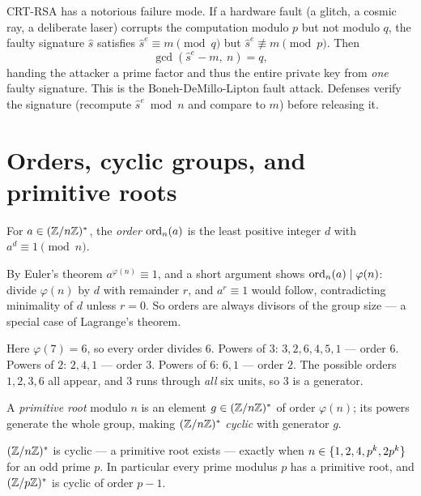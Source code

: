 \begin{attackbox}
CRT-RSA has a notorious failure mode. If a hardware fault (a glitch, a cosmic ray, a deliberate
laser) corrupts the computation modulo $p$ but not modulo $q$, the faulty signature $\hat s$
satisfies $\hat s^e \equiv m \pmod q$ but $\hat s^e \not\equiv m\pmod p$. Then
\[
  \gcd(\hat s^e - m,\ n) = q,
\]
handing the attacker a prime factor and thus the entire private key from \emph{one} faulty
signature. This is the Boneh-DeMillo-Lipton fault attack. Defenses verify the signature (recompute
$\hat s^e \bmod n$ and compare to $m$) before releasing it.
\end{attackbox}

\section{Orders, cyclic groups, and primitive roots}
\label{ch40:orders}

\begin{definition}
\label{ch40:def-order}
For $a\in(\mathbb{Z}/n\mathbb{Z})^{*}$, the \emph{order} $\operatorname{ord}_n(a)$ is the least positive integer $d$ with $a^d\equiv 1
\pmod n$.
\end{definition}

By Euler's theorem $a^{\varphi(n)}\equiv 1$, and a short argument shows $\operatorname{ord}_n(a)\mid\varphi(n)$:
divide $\varphi(n)$ by $d$ with remainder $r$, and $a^{r}\equiv 1$ would follow, contradicting
minimality of $d$ unless $r=0$. So orders are always divisors of the group size --- a special case of
Lagrange's theorem.

\begin{example}
\label{ch40:ex-order}
Here $\varphi(7)=6$, so every order divides $6$. Powers of $3$: $3,2,6,4,5,1$ --- order $6$. Powers
of $2$: $2,4,1$ --- order $3$. Powers of $6$: $6,1$ --- order $2$. The possible orders $1,2,3,6$ all
appear, and $3$ runs through \emph{all} six units, so $3$ is a generator.
\end{example}

\begin{definition}
\label{ch40:def-primroot}
A \emph{primitive root} modulo $n$ is an element $g\in(\mathbb{Z}/n\mathbb{Z})^{*}$ of order $\varphi(n)$; its powers
generate the whole group, making $(\mathbb{Z}/n\mathbb{Z})^{*}$ \emph{cyclic} with generator $g$.
\end{definition}

\begin{theorem}
\label{ch40:thm-primroot}
$(\mathbb{Z}/n\mathbb{Z})^{*}$ is cyclic --- a primitive root exists --- exactly when $n\in\{1,2,4,p^k,2p^k\}$ for an
odd prime $p$. In particular every prime modulus $p$ has a primitive root, and $(\mathbb{Z}/p\mathbb{Z})^{*}$ is cyclic
of order $p-1$.
\end{theorem}

